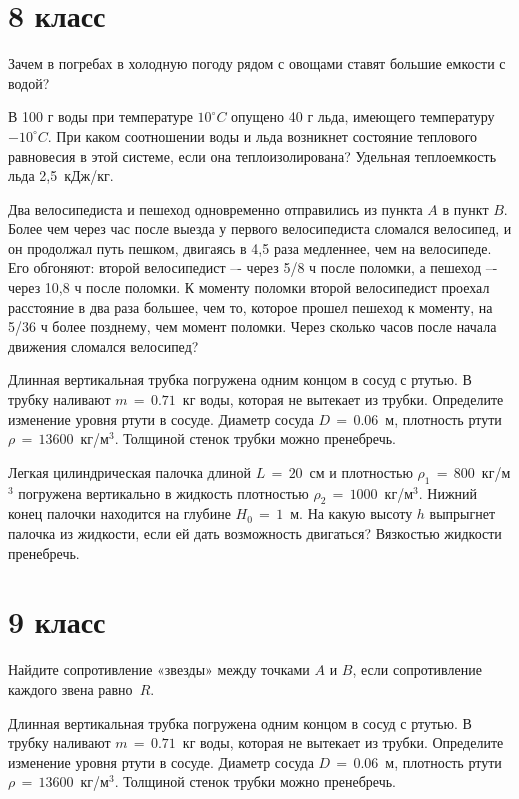 \section{8 класс}

\AddProb Зачем в погребах в холодную погоду рядом с овощами ставят большие емкости с водой?

\AddProb В 100 г воды при температуре $10^{\circ}C$ опущено 40 г льда, имеющего температуру $-10^{\circ}C$. При каком соотношении воды и льда 
возникнет состояние теплового равновесия в этой системе, если она теплоизолирована? Удельная теплоемкость льда 2,5~кДж/кг.

\AddProb Два велосипедиста и пешеход одновременно отправились из пункта $A$ в пункт $B$. 
Более чем через час после выезда у первого велосипедиста сломался велосипед, и он продолжал путь пешком, двигаясь в 4,5 раза медленнее, чем на велосипеде. 
Его обгоняют: второй велосипедист –- через 5/8 ч после поломки, а пешеход –- через 10,8 ч после поломки. 
К моменту поломки второй велосипедист проехал расстояние в два раза большее, чем то, которое прошел пешеход к моменту, на 5/36 ч более позднему, 
чем момент поломки. Через сколько часов после начала движения сломался велосипед?

\AddProb Длинная вертикальная трубка погружена одним концом в сосуд с ртутью. В трубку наливают $m\,=\,0.71$~кг воды, которая не вытекает из трубки. 
Определите изменение уровня ртути в сосуде. Диаметр сосуда $D\,=\,0.06$~м, плотность ртути $\rho\,=\,13600$~кг/м$^3$. 
Толщиной стенок трубки можно пренебречь.

\AddProb Легкая цилиндрическая палочка длиной $L\,=\,20$~см и плотностью $\rho_1\,=\,800$~кг/м$^3$ погружена вертикально в жидкость плотностью 
$\rho_2\,=\,1000$~кг/м$^3$. Нижний конец палочки находится на глубине $H_0\,=\,1$~м. На какую высоту $h$ выпрыгнет палочка из жидкости, 
если ей дать возможность двигаться? Вязкостью жидкости пренебречь.



\section{9 класс}

\AddProb Найдите сопротивление «звезды» между точками $A$ и $B$, если сопротивление каждого звена равно~$R$.

\AddProb Длинная вертикальная трубка погружена одним концом в сосуд с ртутью. В трубку наливают $m\,=\,0.71$~кг воды, которая не вытекает из трубки. 
Определите изменение уровня ртути в сосуде. Диаметр сосуда $D\,=\,0.06$~м, плотность ртути $\rho\,=\,13600$~кг/м$^3$. 
Толщиной стенок трубки можно пренебречь.

